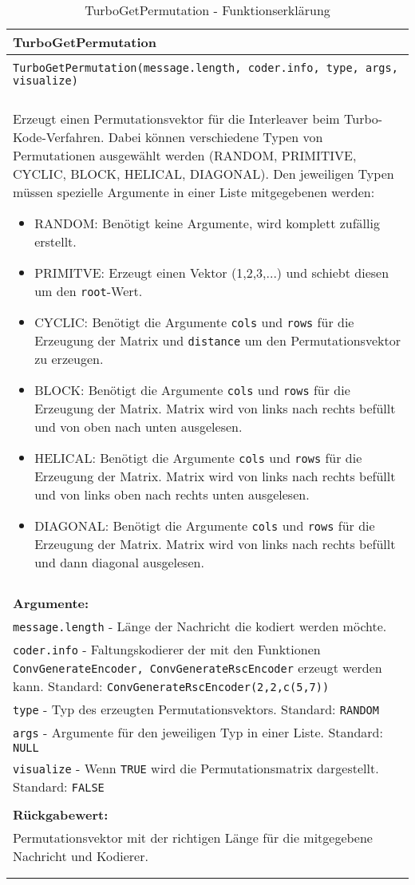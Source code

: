 \begin{longtable}{|p{\textwidth}|}
\hline
\rowcolor{lightblue}TurboGetPermutation\\
\hline
\\
\texttt{TurboGetPermutation(message.length, coder.info, type, args, visualize)}\\
\\
Erzeugt einen Permutationsvektor für die Interleaver beim Turbo-Kode-Verfahren. Dabei können verschiedene Typen von Permutationen ausgewählt werden (RANDOM, PRIMITIVE, CYCLIC, BLOCK, HELICAL, DIAGONAL). Den jeweiligen Typen müssen spezielle Argumente in einer Liste mitgegebenen werden:
\begin{itemize}
\item RANDOM: Benötigt keine Argumente, wird komplett zufällig erstellt.
\item PRIMITVE: Erzeugt einen Vektor (1,2,3,...) und schiebt diesen um den \texttt{root}-Wert.
\item CYCLIC: Benötigt die Argumente \texttt{cols} und \texttt{rows} für die Erzeugung der Matrix und \texttt{distance} um den Permutationsvektor zu erzeugen.
\item BLOCK: Benötigt die Argumente \texttt{cols} und \texttt{rows} für die Erzeugung der Matrix. Matrix wird von links nach rechts befüllt und von oben nach unten ausgelesen.
\item HELICAL: Benötigt die Argumente \texttt{cols} und \texttt{rows} für die Erzeugung der Matrix. Matrix wird von links nach rechts befüllt und von links oben nach rechts unten ausgelesen.
\item DIAGONAL: Benötigt die Argumente \texttt{cols} und \texttt{rows} für die Erzeugung der Matrix. Matrix wird von links nach rechts befüllt und dann diagonal ausgelesen.
\end{itemize} \\
\\
\textbf{Argumente:}\\
\texttt{message.length} - Länge der Nachricht die kodiert werden möchte.\\
\texttt{coder.info} - Faltungskodierer der mit den Funktionen \texttt{ConvGenerateEncoder, ConvGenerateRscEncoder} erzeugt werden kann. Standard: \texttt{ConvGenerateRscEncoder(2,2,c(5,7))}\\
\texttt{type} - Typ des erzeugten Permutationsvektors. Standard: \texttt{RANDOM}\\
\texttt{args} - Argumente für den jeweiligen Typ in einer Liste. Standard: \texttt{NULL}\\
\texttt{visualize} - Wenn \texttt{TRUE} wird die Permutationsmatrix dargestellt. Standard: \texttt{FALSE}\\
\\
\textbf{Rückgabewert:}\\
Permutationsvektor mit der richtigen Länge für die mitgegebene Nachricht und Kodierer.\\
\\
\hline
\caption[TurboGetPermutation]{TurboGetPermutation - Funktionserklärung}
\end{longtable}